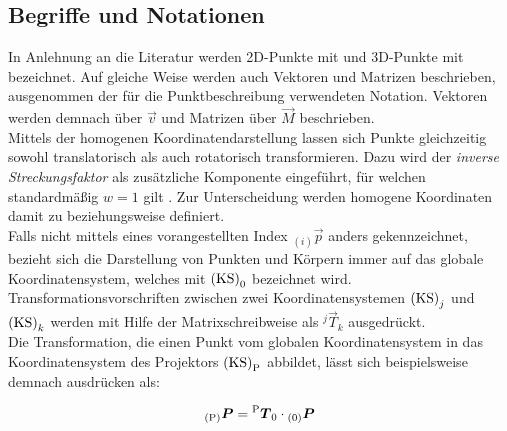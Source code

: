 \subsection{Begriffe und Notationen}
In Anlehnung an die Literatur \cite{Zhang2000} werden 2D-Punkte mit  und 3D-Punkte mit  bezeichnet. Auf gleiche Weise werden auch Vektoren und Matrizen beschrieben, ausgenommen der für die Punktbeschreibung verwendeten Notation. Vektoren werden demnach über $\vec{v}$ und Matrizen über $\vec{M}$ beschrieben.\\
Mittels der homogenen Koordinatendarstellung lassen sich Punkte gleichzeitig sowohl translatorisch als auch rotatorisch transformieren. Dazu wird der \textit{inverse Streckungsfaktor} als zusätzliche Komponente eingeführt, für welchen standardmäßig $w=1$ gilt \cite{Nischwitz20111}. Zur Unterscheidung werden homogene Koordinaten damit zu  beziehungsweise  definiert.\\
Falls nicht mittels eines vorangestellten Index $_{(i)}\vec{p}$ anders gekennzeichnet, bezieht sich die Darstellung von Punkten und Körpern immer auf das globale Koordinatensystem, welches mit ${\mathrm{(KS)}}_{\mathrm{0}}$ bezeichnet wird. Transformationsvorschriften zwischen zwei Koordinatensystemen ${\mathrm{(KS)}}_j$ und ${\mathrm{(KS)}}_k$ werden mit Hilfe der Matrixschreibweise als ${^{j}\vec{T}_{k}}$ ausgedrückt.\\
Die Transformation, die einen Punkt vom globalen Koordinatensystem in das Koordinatensystem des Projektors ${\mathrm{(KS)}}_{\mathrm{P}}$ abbildet, lässt sich beispielsweise demnach ausdrücken als:

\begin{equation}
{_{{\mathrm{(P)}}}}\mbox{\boldmath{$P$}} = {^{\mathrm{P}}\mbox{\boldmath{$T$}}_{\mathrm{0}}}\cdot{_{{\mathrm{(0)}}}}\mbox{\boldmath{$P$}}
\end{equation}




